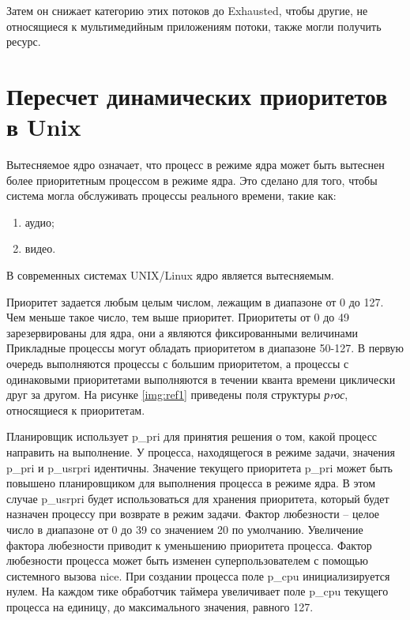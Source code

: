 \documentclass[a4paper,oneside,14pt]{extreport}
\begin{document}
Затем он снижает категорию этих потоков до Exhausted,
чтобы другие, не относящиеся к мультимедийным
приложениям потоки, также могли получить ресурс.

\section*{Пересчет динамических приоритетов в Unix}

Вытесняемое ядро означает, что процесс в режиме ядра 
может быть вытеснен более приоритетным процессом в режиме ядра. \cite{UNIX}
Это сделано для того, чтобы система могла обслуживать процессы реального времени,
такие как:

\begin{enumerate}
	\item аудио;
	\item видео.
\end{enumerate}

В современных системах UNIX/Linux ядро является вытесняемым.

Приоритет задается любым целым числом, лежащим в диапазоне от 0 до 127. 
Чем меньше такое число, тем выше приоритет. 
Приоритеты от 0 до 49 зарезервированы для ядра, они а являются фиксированными величинами
Прикладные процессы могут обладать приоритетом в диапазоне 50-127.
В первую очередь выполняются процессы с большим приоритетом,
а процессы с одинаковыми приоритетами выполняются в течении кванта
времени циклически друг за другом. 
На рисунке \ref{img:ref1} приведены поля структуры \textit{рrос},
относящиеся к приоритетам.

\begin{figure}[ht!]
\end{figure}

Планировщик использует p\_pri для принятия решения о том,
какой процесс направить на выполнение.
У процесса, находящегося в режиме задачи, значения p\_pri и p\_usrpri идентичны.
Значение текущего приоритета p\_pri может быть повышено планировщиком для выполнения процесса в режиме ядра. 
В этом случае p\_usrpri будет использоваться для хранения приоритета, который будет назначен процессу
при возврате в режим задачи. 
Фактор любезности – целое число в диапазоне от 0 до 39 со значением
20 по умолчанию. Увеличение фактора любезности приводит к уменьшению 
приоритета процесса. Фактор любезности процесса может быть
изменен суперпользователем с помощью системного вызова nice.
При создании процесса поле p\_cpu инициализируется нулем. 
На каждом тике обработчик 
таймера увеличивает поле p\_cpu текущего процесса на единицу,
до максимального значения, 
равного 127.
\end{document}
